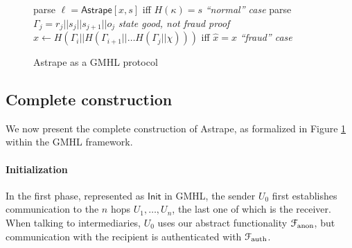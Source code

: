 \documentclass[USenglish,oneside,twocolumn]{article}
\begin{document}
\begin{figure}
\begin{framed}
\begin{minipage}{0.45\textwidth}
            \medskip
            \begin{algorithmic}
                \State parse $\ell = \mathsf{Astrape}[x,s]$
                \State {} iff $H(\kappa) = s$
                \Comment \emph{``normal'' case}
                \State {}
                \EndIf
                \State parse $\Gamma_j=r_j||s_j||s_{j+1}||o_j$
                \State {}
                \Comment \emph{state good, not fraud proof}
                \EndIf
                \State $\hat{x} \gets H(\Gamma_i || H(\Gamma_{i+1}||\dots H(\Gamma_j || \chi)))$
                \State {} iff $\hat{x} = x$
                \Comment \emph{``fraud'' case}
                \EndIf
                \EndFunction
            \end{algorithmic}
        \end{minipage}
    \end{framed}
    \caption{Astrape as a GMHL protocol}
    \label{fig:astrapegm}
\end{figure}

\subsection{Complete construction}

We now present the complete construction of Astrape, as formalized in Figure \ref{fig:astrapegm} within the GMHL framework.

\paragraph*{Initialization}

In the first phase, represented as $\mathsf{Init}$ in GMHL, the sender $U_0$ first establishes communication to the $n$ hops $U_1,\dots,U_n$, the last one of which is the receiver. When talking to intermediaries, $U_0$ uses our abstract functionality $\mathcal{F}_\mathrm{anon}$, but communication with the recipient is authenticated with $\mathcal{F}_\mathrm{auth}$.
\end{document}
